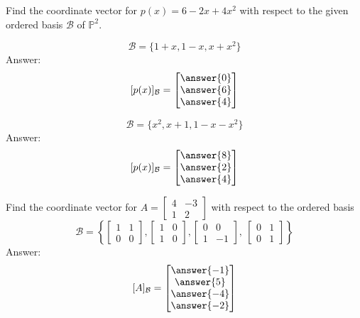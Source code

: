 \documentclass{ximera}
\begin{document}
\begin{problem}
Find the coordinate vector for $p(x)=6-2x+4x^2$ with respect to the given ordered basis $\mathcal{B}$ of $\mathbb{P}^2$.

\begin{problem}\label{prob:coordvectors1}
$$\mathcal{B}=\{1 + x, 1 - x, x + x^{2}\}$$
Answer:
$$[p(x)]_{\mathcal{B}}=\begin{bmatrix}\answer{0}\\\answer{6}\\\answer{4}\end{bmatrix}$$
\end{problem}

\begin{problem}\label{prob:coordvectors2}
$$\mathcal{B}=\{x^{2}, x + 1, 1 - x - x^{2}\}$$
Answer:
$$[p(x)]_{\mathcal{B}}=\begin{bmatrix}\answer{8}\\\answer{2}\\\answer{4}\end{bmatrix}$$
\end{problem}
\end{problem}
\begin{problem}\label{prob:coordvectors3}
Find the coordinate vector for $A=\begin{bmatrix}4&-3\\1&2\end{bmatrix}$ with respect to the ordered basis
$$\mathcal{B}=
\left\{
\begin{bmatrix}
1 & 1 \\
0 & 0
\end{bmatrix}
, 
\begin{bmatrix}
1 & 0 \\
1 & 0
\end{bmatrix}
, 
\begin{bmatrix}
0 & 0 \\
1 & -1
\end{bmatrix}
,\
\begin{bmatrix}
0 & 1 \\
0 & 1
\end{bmatrix}
\right\}$$ 
Answer:
$$[A]_{\mathcal{B}}=\begin{bmatrix}\answer{-1}\\\answer{5}\\\answer{-4}\\\answer{-2}\end{bmatrix}$$
\end{problem}
\end{document}

